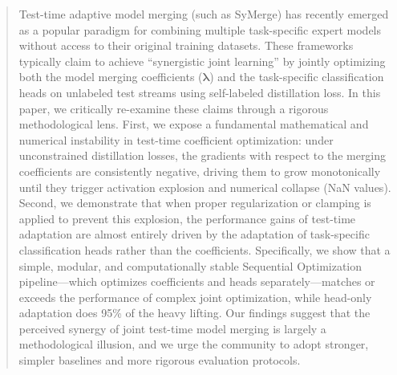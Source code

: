 \documentclass{article}
\theoremstyle{plain}
\theoremstyle{definition}
\theoremstyle{remark}
\begin{document}

\printAffiliationsAndNotice{}

\begin{abstract}
Test-time adaptive model merging (such as SyMerge) has recently emerged as a popular paradigm for combining multiple task-specific expert models without access to their original training datasets. These frameworks typically claim to achieve ``synergistic joint learning'' by jointly optimizing both the model merging coefficients ($\boldsymbol{\lambda}$) and the task-specific classification heads on unlabeled test streams using self-labeled distillation loss. In this paper, we critically re-examine these claims through a rigorous methodological lens. First, we expose a fundamental mathematical and numerical instability in test-time coefficient optimization: under unconstrained distillation losses, the gradients with respect to the merging coefficients are consistently negative, driving them to grow monotonically until they trigger activation explosion and numerical collapse (NaN values). Second, we demonstrate that when proper regularization or clamping is applied to prevent this explosion, the performance gains of test-time adaptation are almost entirely driven by the adaptation of task-specific classification heads rather than the coefficients. Specifically, we show that a simple, modular, and computationally stable Sequential Optimization pipeline—which optimizes coefficients and heads separately—matches or exceeds the performance of complex joint optimization, while head-only adaptation does 95\% of the heavy lifting. Our findings suggest that the perceived synergy of joint test-time model merging is largely a methodological illusion, and we urge the community to adopt stronger, simpler baselines and more rigorous evaluation protocols.
\end{abstract}
\end{document}
